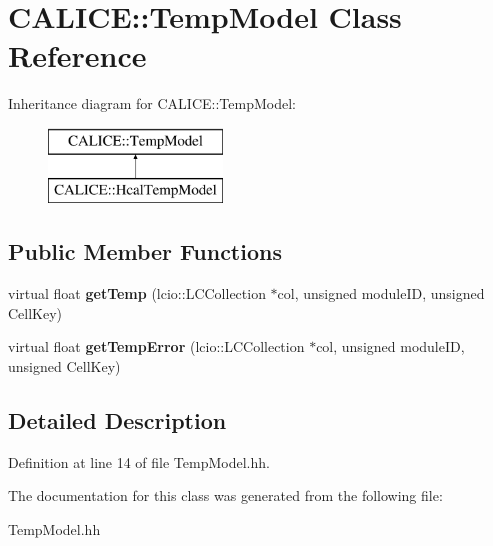 \section{C\-A\-L\-I\-C\-E\-:\-:Temp\-Model Class Reference}
\label{classCALICE_1_1TempModel}
Inheritance diagram for C\-A\-L\-I\-C\-E\-:\-:Temp\-Model\-:\begin{figure}[H]
\begin{center}
\leavevmode
\includegraphics[height=2.000000cm]{classCALICE_1_1TempModel}
\end{center}
\end{figure}
\subsection*{Public Member Functions}
\begin{DoxyCompactItemize}
\item 
virtual float {\bfseries get\-Temp} (lcio\-::\-L\-C\-Collection $\ast$col, unsigned module\-I\-D, unsigned Cell\-Key)\label{classCALICE_1_1TempModel_ad1cc8ffc2484c36beed93c4191b8e7e6}

\item 
virtual float {\bfseries get\-Temp\-Error} (lcio\-::\-L\-C\-Collection $\ast$col, unsigned module\-I\-D, unsigned Cell\-Key)\label{classCALICE_1_1TempModel_a8fab6288f361da8d51cb2b045497dd56}

\end{DoxyCompactItemize}


\subsection{Detailed Description}


Definition at line 14 of file Temp\-Model.\-hh.



The documentation for this class was generated from the following file\-:\begin{DoxyCompactItemize}
\item 
Temp\-Model.\-hh\end{DoxyCompactItemize}
